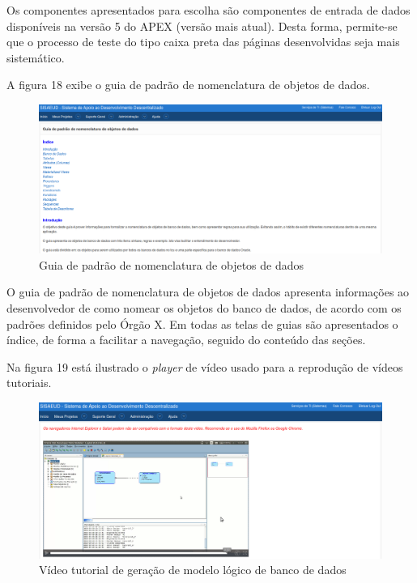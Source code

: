 Os componentes apresentados para escolha são componentes de entrada de dados disponíveis na versão 5 do APEX (versão mais atual). Desta forma, permite-se que o processo de teste do tipo caixa preta das páginas desenvolvidas seja mais sistemático.

A figura 18 exibe o guia de padrão de nomenclatura de objetos de dados.

\begin{figure}[!htb]
	\hspace*{-1.0cm} 
		\includegraphics[scale=0.40]{figuras/guia_nomenclatura_bd_p54}
	\caption{Guia de padrão de nomenclatura de objetos de dados}
\end{figure}

O guia de padrão de nomenclatura de objetos de dados apresenta informações ao desenvolvedor de como nomear os objetos do banco de dados, de acordo com os padrões definidos pelo Órgão X. Em todas as telas de guias são apresentados o índice, de forma a facilitar a navegação, seguido do conteúdo das seções.

Na figura 19 está ilustrado o \textit{player} de vídeo usado para a reprodução de vídeos tutoriais.

\begin{figure}[!htb]
	\hspace*{-1.5cm} 
		\includegraphics[scale=0.40]{figuras/video_p51}
	\caption{Vídeo tutorial de geração de modelo lógico de banco de dados}
\end{figure}

